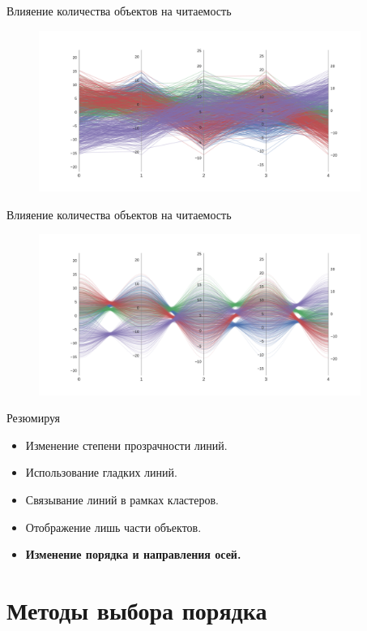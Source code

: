 \documentclass[fleqn, xcolor=x11names]{beamer}
\begin{document}
\begin{frame}{Влияение количества объектов на читаемость}
    \begin{figure}[htb]
        \centering
        \includegraphics[width=10.5cm]{base_bad_clustering.pdf}
    \end{figure}
\end{frame}

\begin{frame}{Влияение количества объектов на читаемость}
    \begin{figure}[htb]
        \centering
        \includegraphics[width=10.5cm]{bad_clustering.pdf}
    \end{figure}
\end{frame}

\begin{frame}{Резюмируя}
    \begin{itemize}
        \item Изменение степени прозрачности линий.
        \item Использование гладких линий.
        \item Связывание линий в рамках кластеров.
        \item Отображение лишь части объектов.
        \item \textbf{Изменение порядка и направления осей.}
    \end{itemize}
\end{frame}

\section{Методы выбора порядка}
\end{document}
